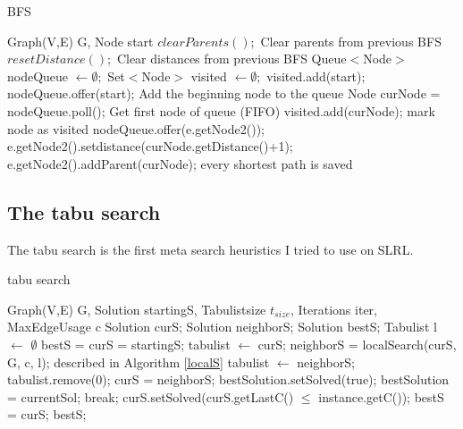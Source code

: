 \documentclass [12pt]{article}
\begin{document}
\begin{algorithm}[H]
  \caption{BFS}
  \label{BFS}
  \begin{algorithmic}[2]
    \Require Graph(V,E) G, Node start
    \State $clearParents();$ \Comment Clear parents from previous BFS
    \State $resetDistance();$ \Comment Clear distances from previous BFS
    \State Queue$<$Node$>$ nodeQueue $\gets \emptyset;$
    \State Set$<$Node$>$ visited $\gets \emptyset;$
    \State visited.add(start);
    \State nodeQueue.offer(start); \Comment Add the beginning node to the queue 
    \State Node curNode = nodeQueue.poll(); \Comment Get first node of queue (FIFO)
    \State visited.add(curNode); \Comment mark node as visited
              \State nodeQueue.offer(e.getNode2());
              \State e.getNode2().setdistance(curNode.getDistance()+1);
        \EndIf
              \State e.getNode2().addParent(curNode); \Comment every shortest path is saved 
        \EndIf
      \EndFor
    \EndWhile
  \end{algorithmic}
\end{algorithm}

\subsection{The tabu search}
The tabu search is the first meta search heuristics I tried to use on SLRL.
\begin {algorithm} [H]
\caption {tabu search}
\label {tabusa}
\begin {algorithmic} [3]
\Require Graph(V,E) G, Solution startingS, Tabulistsize $t_{size}$, Iterations iter, MaxEdgeUsage c
\State Solution curS;
\State Solution neighborS;
\State Solution bestS;
\State Tabulist l $\gets$ $\emptyset$
\State bestS = curS = startingS;
\State tabulist $\gets$ curS;
  \State  neighborS = localSearch(curS, G, c, l); \Comment described in Algorithm \ref{localS}
  \State  tabulist $\gets$ neighborS;
    \State tabulist.remove(0);
  \EndIf
  \State  curS = neighborS;
    \State bestSolution.setSolved(true);
    \State bestSolution = currentSol;
      \State break; 
    \EndIf
  \EndIf  
    \State curS.setSolved(curS.getLastC() $\leq$ instance.getC());
    \State bestS = curS;
   \EndIf 
\EndFor
\Return bestS;
\end {algorithmic}
\end {algorithm}
\end{document}
